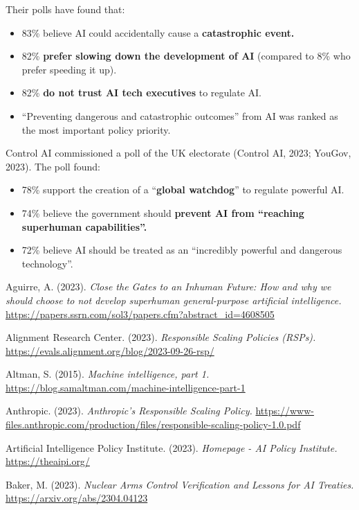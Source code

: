 \documentclass[12pt,a4paper]{article}
\begin{document}
Their polls have found that:
\begin{itemize}
    \item 83\% believe AI could accidentally cause a \textbf{catastrophic event.}
    \item 82\% \textbf{prefer slowing down the development of AI} (compared to 8\% who prefer speeding it up).
    \item 82\%\textbf{ do not trust AI tech executives }to regulate AI.
    \item “Preventing dangerous and catastrophic outcomes” from AI was ranked as the most important policy priority.
\end{itemize}


Control AI commissioned a poll of the UK electorate (Control AI, 2023; YouGov, 2023). The poll found:
\begin{itemize}
    \item 78\% support the creation of a “\textbf{global watchdog}” to regulate powerful AI.
    \item 74\% believe the government should \textbf{prevent AI from “reaching superhuman capabilities”.}
    \item 72\% believe AI should be treated as an “incredibly powerful and dangerous technology”.
\end{itemize}

\pagebreak



\sloppy

Aguirre, A. (2023). \textit{Close the Gates to an Inhuman Future: How and why we should choose to not develop superhuman general-purpose artificial intelligence.} \url{https://papers.ssrn.com/sol3/papers.cfm?abstract_id=4608505}

Alignment Research Center. (2023). \textit{Responsible Scaling Policies (RSPs).} \url{https://evals.alignment.org/blog/2023-09-26-rsp/}

Altman, S. (2015). \textit{Machine intelligence, part 1.} \url{https://blog.samaltman.com/machine-intelligence-part-1}

Anthropic. (2023). \textit{Anthropic’s Responsible Scaling Policy.} \url{https://www-files.anthropic.com/production/files/responsible-scaling-policy-1.0.pdf}

Artificial Intelligence Policy Institute. (2023). \textit{Homepage - AI Policy Institute.} \url{https://theaipi.org/}

Baker, M. (2023). \textit{Nuclear Arms Control Verification and Lessons for AI Treaties. }\url{https://arxiv.org/abs/2304.04123}
\end{document}
